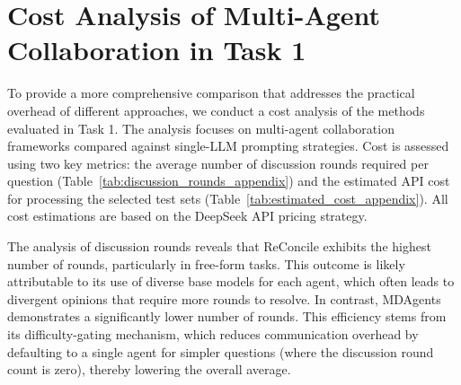 \documentclass{article}
\begin{document}


\section{Cost Analysis of Multi-Agent Collaboration in Task 1}
\label{sec:app_cost_analysis}

To provide a more comprehensive comparison that addresses the practical overhead of different approaches, we conduct a cost analysis of the methods evaluated in Task 1. The analysis focuses on multi-agent collaboration frameworks compared against single-LLM prompting strategies. Cost is assessed using two key metrics: the average number of discussion rounds required per question (Table~\ref{tab:discussion_rounds_appendix}) and the estimated API cost for processing the selected test sets (Table~\ref{tab:estimated_cost_appendix}). All cost estimations are based on the DeepSeek API pricing strategy.

\begin{table}[!ht]
\centering
\caption{\textit{Average number of discussion rounds per question across different multi-agent frameworks and datasets.}}
\label{tab:discussion_rounds_appendix}
\end{table}

The analysis of discussion rounds reveals that ReConcile exhibits the highest number of rounds, particularly in free-form tasks. This outcome is likely attributable to its use of diverse base models for each agent, which often leads to divergent opinions that require more rounds to resolve. In contrast, MDAgents demonstrates a significantly lower number of rounds. This efficiency stems from its difficulty-gating mechanism, which reduces communication overhead by defaulting to a single agent for simpler questions (where the discussion round count is zero), thereby lowering the overall average.
\end{document}
